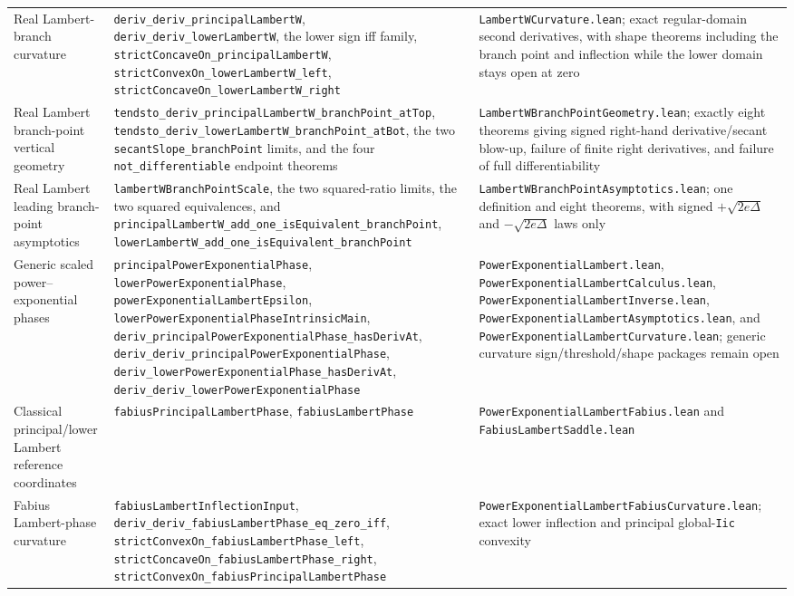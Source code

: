\documentclass[11pt,oneside]{article}
\theoremstyle{definition}
\theoremstyle{remark}
\begin{document}
\begin{longtable}{@{}>{\raggedright\arraybackslash}p{} >{\raggedright\arraybackslash}p{} >{\raggedright\arraybackslash}p{}@{}}
Real Lambert-branch curvature & \nolinkurl{deriv_deriv_principalLambertW}, \nolinkurl{deriv_deriv_lowerLambertW}, the lower sign iff family, \nolinkurl{strictConcaveOn_principalLambertW}, \nolinkurl{strictConvexOn_lowerLambertW_left}, \nolinkurl{strictConcaveOn_lowerLambertW_right} & \nolinkurl{LambertWCurvature.lean}; exact regular-domain second derivatives, with shape theorems including the branch point and inflection while the lower domain stays open at zero \\
Real Lambert branch-point vertical geometry & \nolinkurl{tendsto_deriv_principalLambertW_branchPoint_atTop}, \nolinkurl{tendsto_deriv_lowerLambertW_branchPoint_atBot}, the two \nolinkurl{secantSlope_branchPoint} limits, and the four \nolinkurl{not_differentiable} endpoint theorems & \nolinkurl{LambertWBranchPointGeometry.lean}; exactly eight theorems giving signed right-hand derivative/secant blow-up, failure of finite right derivatives, and failure of full differentiability \\
Real Lambert leading branch-point asymptotics & \nolinkurl{lambertWBranchPointScale}, the two squared-ratio limits, the two squared equivalences, and \nolinkurl{principalLambertW_add_one_isEquivalent_branchPoint}, \nolinkurl{lowerLambertW_add_one_isEquivalent_branchPoint} & \nolinkurl{LambertWBranchPointAsymptotics.lean}; one definition and eight theorems, with signed \(+\sqrt{2e\Delta}\) and \(-\sqrt{2e\Delta}\) laws only \\
Generic scaled power--exponential phases & \nolinkurl{principalPowerExponentialPhase}, \nolinkurl{lowerPowerExponentialPhase}, \nolinkurl{powerExponentialLambertEpsilon}, \nolinkurl{lowerPowerExponentialPhaseIntrinsicMain}, \nolinkurl{deriv_principalPowerExponentialPhase_hasDerivAt}, \nolinkurl{deriv_deriv_principalPowerExponentialPhase}, \nolinkurl{deriv_lowerPowerExponentialPhase_hasDerivAt}, \nolinkurl{deriv_deriv_lowerPowerExponentialPhase} & \nolinkurl{PowerExponentialLambert.lean}, \nolinkurl{PowerExponentialLambertCalculus.lean}, \nolinkurl{PowerExponentialLambertInverse.lean}, \nolinkurl{PowerExponentialLambertAsymptotics.lean}, and \nolinkurl{PowerExponentialLambertCurvature.lean}; generic curvature sign/threshold/shape packages remain open \\
Classical principal/lower Lambert reference coordinates & \nolinkurl{fabiusPrincipalLambertPhase}, \nolinkurl{fabiusLambertPhase} & \nolinkurl{PowerExponentialLambertFabius.lean} and \nolinkurl{FabiusLambertSaddle.lean} \\
Fabius Lambert-phase curvature & \nolinkurl{fabiusLambertInflectionInput}, \nolinkurl{deriv_deriv_fabiusLambertPhase_eq_zero_iff}, \nolinkurl{strictConvexOn_fabiusLambertPhase_left}, \nolinkurl{strictConcaveOn_fabiusLambertPhase_right}, \nolinkurl{strictConvexOn_fabiusPrincipalLambertPhase} & \nolinkurl{PowerExponentialLambertFabiusCurvature.lean}; exact lower inflection and principal global-\nolinkurl{Iic} convexity \\

\end{longtable}
\end{document}
